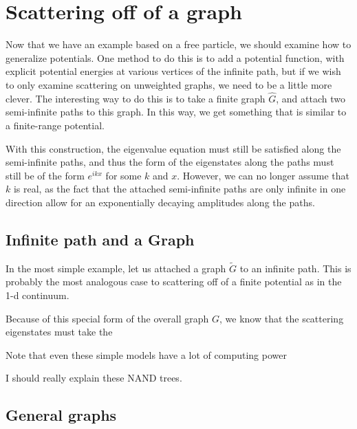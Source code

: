\documentclass[../thesis-main/thesis-main]{subfiles}
\begin{document}
\section{Scattering off of a graph}

Now that we have an example based on a free particle, we should examine how to generalize potentials.  One method to do this is to add a potential function, with explicit potential energies at various vertices of the infinite path, but if we wish to only examine scattering on unweighted graphs, we need to be a little more clever.  The interesting way to do this is to take a finite graph $\hat{G}$, and attach two semi-infinite paths to this graph.  In this way, we get something that is similar to a finite-range potential.

With this construction, the eigenvalue equation must still be satisfied along the semi-infinite paths, and thus the form of the eigenstates along the paths must still be of the form $e^{i k x}$ for some $k$ and $x$.  However, we can no longer assume that $k$ is real, as the fact that the attached semi-infinite paths are only infinite in one direction allow for an exponentially decaying amplitudes along the paths.


\subsection{Infinite path and a Graph}

In the most simple example, let us attached a graph $\widetilde{G}$ to an infinite path.  This is probably the most analogous case to scattering off of a finite potential as in the 1-d continuum.  

Because of this special form of the overall graph $G$, we know that the scattering eigenstates must take the 

Note that even these simple models have a lot of computing power

I should really explain these NAND trees.


\subsection{General graphs}
\end{document}
